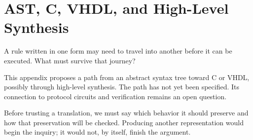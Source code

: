 \chapter{AST, C, VHDL, and High-Level Synthesis}
\label{short:ast-and-hls}

A rule written in one form may need to travel into another before it can
be executed. What must survive that journey?

This appendix proposes a path from an abstract syntax tree toward C or
VHDL, possibly through high-level synthesis. The path has not yet been
specified. Its connection to protocol circuits and verification remains
an open question.

Before trusting a translation, we must say which behavior it should
preserve and how that preservation will be checked. Producing another
representation would begin the inquiry; it would not, by itself, finish
the argument.

